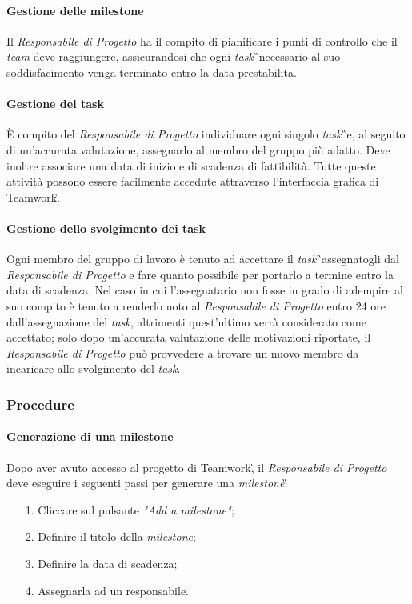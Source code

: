 \paragraph{Gestione delle milestone} 
Il \textit{Responsabile di Progetto} ha il compito di pianificare i punti di controllo che il \textit{team} deve raggiungere, assicurandosi che ogni \textit{task}\G\ necessario al suo soddisfacimento venga terminato entro la data prestabilita.

\paragraph{Gestione dei task} 
È compito del \textit{Responsabile di Progetto} individuare ogni singolo \textit{task}\G\ e, al seguito di un'accurata valutazione, assegnarlo al membro del gruppo più adatto. Deve inoltre associare una data di inizio e di scadenza di fattibilità. Tutte queste attività possono essere facilmente accedute attraverso l'interfaccia grafica di Teamwork\G.

\paragraph{Gestione dello svolgimento dei task}
Ogni membro del gruppo di lavoro è tenuto ad accettare il \textit{task}\G\ assegnatogli dal \textit{Responsabile di Progetto} e fare quanto possibile per portarlo a termine entro la data di scadenza. Nel caso in cui l'assegnatario non fosse in grado di adempire al suo compito è tenuto a renderlo noto al \textit{Responsabile di Progetto} entro 24 ore dall'assegnazione del \textit{task}, altrimenti quest'ultimo verrà considerato come accettato; solo dopo un'accurata valutazione delle motivazioni riportate, il \textit{Responsabile di Progetto} può provvedere a trovare un nuovo membro da incaricare allo svolgimento del \textit{task}.

\subsubsection{Procedure}
\paragraph{Generazione di una milestone}
Dopo aver avuto accesso al progetto di Teamwork\G, il \textit{Responsabile di Progetto} deve eseguire i seguenti passi per generare una \textit{milestone}\G:
\begin{itemize}
\item [1.] Cliccare sul pulsante \textit{"Add a milestone"};
\item [2.] Definire il titolo della \textit{milestone};
\item [3.] Definire la data di scadenza;
\item [4.] Assegnarla ad un responsabile.
\end{itemize}

